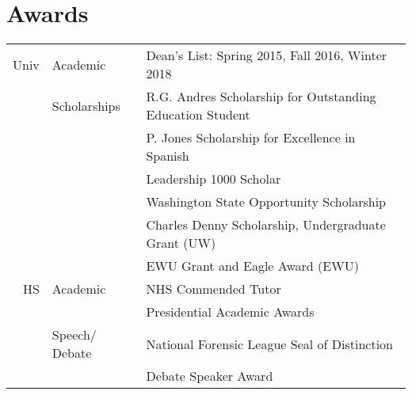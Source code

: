 \documentclass[]{deedy-resume-openfont}
\begin{document}
\begin{minipage}[t]{0.66\textwidth}
\sectionsep



\section{Awards} 
\begin{tabular}{rll}
Univ& Academic & Dean's List: Spring 2015, Fall 2016, Winter 2018\\
 & Scholarships & R.G. Andres Scholarship for Outstanding Education Student\\
 & & P. Jones Scholarship for Excellence in Spanish\\
 & & Leadership 1000 Scholar \\
 & & Washington State Opportunity Scholarship\\
 & & Charles Denny Scholarship, Undergraduate Grant (UW)\\
 & & EWU Grant and Eagle Award (EWU)\\
HS & Academic & NHS Commended Tutor\\
 &  & Presidential Academic Awards\\
 & Speech/ Debate & National Forensic League Seal of Distinction\\
 & & Debate Speaker Award\\


\end{tabular}
\sectionsep



\end{minipage}
\end{document}
